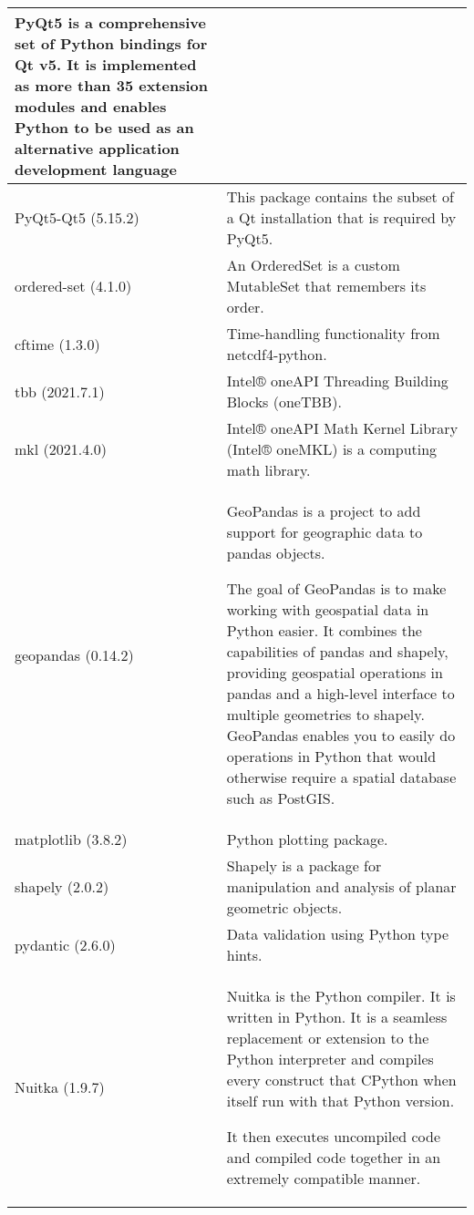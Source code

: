 \begin{longtable}{|p{4cm}|p{10cm}|}
PyQt5 is a comprehensive set of Python bindings for Qt v5. 
It is implemented as more than 35 extension modules and enables Python to be used as an alternative application development language \\ \hline
	PyQt5-Qt5 (5.15.2)            & This package contains the subset of a Qt installation that is required by PyQt5. \\ \hline
	ordered-set (4.1.0)           & An OrderedSet is a custom MutableSet that remembers its order. \\ \hline
	cftime (1.3.0)                & Time-handling functionality from netcdf4-python. \\ \hline
	tbb (2021.7.1)                & Intel® oneAPI Threading Building Blocks (oneTBB). \\ \hline
	mkl (2021.4.0)                & Intel® oneAPI Math Kernel Library (Intel® oneMKL) is a computing math library. \\ \hline
	geopandas (0.14.2)            & GeoPandas is a project to add support for geographic data to pandas objects.

The goal of GeoPandas is to make working with geospatial data in Python easier.
It combines the capabilities of pandas and shapely, providing geospatial operations in pandas and a high-level interface to multiple geometries to shapely.
GeoPandas enables you to easily do operations in Python that would otherwise require a spatial database such as PostGIS.                \\ \hline
	matplotlib (3.8.2)            & Python plotting package. \\ \hline
	shapely (2.0.2)               & Shapely is a package for manipulation and analysis of planar geometric objects. \\ \hline
	pydantic (2.6.0)              & Data validation using Python type hints. \\ \hline \hline
	Nuitka (1.9.7)                & Nuitka is the Python compiler. It is written in Python.
It is a seamless replacement or extension to the Python interpreter and compiles every construct that CPython when itself run with that Python version.

It then executes uncompiled code and compiled code together in an extremely compatible manner.


\end{longtable}
